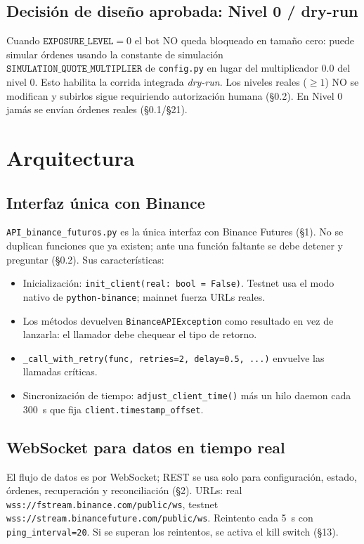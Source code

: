 \documentclass[11pt,a4paper]{article}
\newcommand{\codigo}[1]{\texttt{#1}}
\begin{document}
\subsection{Decisión de diseño aprobada: Nivel 0 / dry-run}
Cuando $\codigo{EXPOSURE\_LEVEL}=0$ el bot NO queda bloqueado en tamaño
cero: puede simular órdenes usando la constante de simulación
$\codigo{SIMULATION\_QUOTE\_MULTIPLIER}$ de \codigo{config.py} en lugar
del multiplicador $0.0$ del nivel 0. Esto habilita la corrida integrada
\emph{dry-run}. Los niveles reales ($\geq 1$) NO se modifican y subirlos
sigue requiriendo autorización humana (§0.2). En Nivel 0 jamás se envían
órdenes reales (§0.1/§21).

\section{Arquitectura}

\subsection{Interfaz única con Binance}
\codigo{API\_binance\_futuros.py} es la única interfaz con Binance
Futures (§1). No se duplican funciones que ya existen; ante una función
faltante se debe detener y preguntar (§0.2). Sus características:

\begin{itemize}
  \item Inicialización: \codigo{init\_client(real: bool = False)}.
  Testnet usa el modo nativo de \codigo{python-binance}; mainnet fuerza
  URLs reales.
  \item Los métodos devuelven \codigo{BinanceAPIException} como
  resultado en vez de lanzarla: el llamador debe chequear el tipo de
  retorno.
  \item \codigo{\_call\_with\_retry(func, retries=2, delay=0.5, ...)}
  envuelve las llamadas críticas.
  \item Sincronización de tiempo: \codigo{adjust\_client\_time()} más un
  hilo daemon cada 300~s que fija \codigo{client.timestamp\_offset}.
\end{itemize}

\subsection{WebSocket para datos en tiempo real}
El flujo de datos es por WebSocket; REST se usa solo para configuración,
estado, órdenes, recuperación y reconciliación (§2). URLs: real
\codigo{wss://fstream.binance.com/public/ws}, testnet
\codigo{wss://stream.binancefuture.com/public/ws}. Reintento cada 5~s
con \codigo{ping\_interval=20}. Si se superan los reintentos, se activa
el kill switch (§13).
\end{document}
